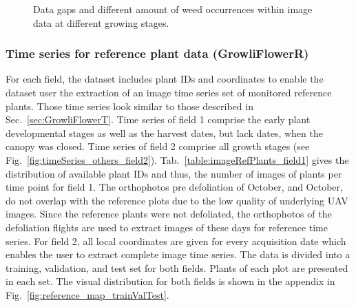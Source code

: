 \documentclass{article}
\def\secref#1{Sec.~\ref{#1}}
\def\figref#1{Fig.~\ref{#1}}
\def\tabref#1{Tab.~\ref{#1}}
\begin{document}
\begin{figure}[t]
	\centering
    \hspace{20pt}
\caption{Data gaps and different amount of weed occurrences within image data at different growing stages.}
	\label{fig:dataGaps_and_weed_in_data}
\end{figure}




\subsubsection{Time series for reference plant data (GrowliFlowerR)}\label{sec:GrowliFlowerR}

For each field, the dataset includes plant IDs and coordinates to enable the dataset user the extraction of an image time series set of monitored reference plants. Those time series look similar to those described in \secref{sec:GrowliFlowerT}. Time series of field 1 comprise the early plant developmental stages as well as the harvest dates, but lack dates, when the canopy was closed. Time series of field 2 comprise all growth stages (see \figref{fig:timeSeries_others_field2}).
\tabref{table:imageRefPlants_field1} gives the distribution of available plant IDs and thus, the number of images of plants per time point for field 1. 
The orthophotos pre defoliation of October,  and October,  do not overlap with the reference plots due to the low quality of underlying UAV images. Since the reference plants were not defoliated, the orthophotos of the defoliation flights are used to extract images of these days for reference time series. 
For field 2, all local coordinates are given for every acquisition date which enables the user to extract complete image time series. The data is divided into a training, validation, and test set for both fields. Plants of each plot are presented in each set. The visual distribution for both fields is shown in the appendix in \figref{fig:reference_map_trainValTest}. 
\end{document}
